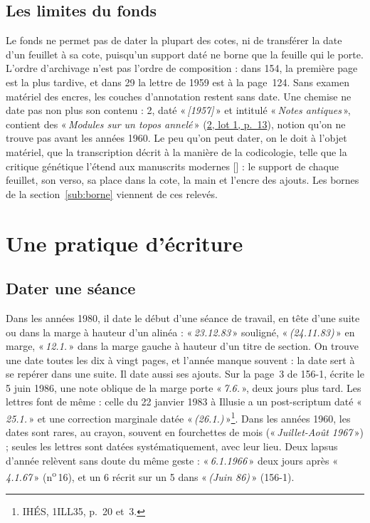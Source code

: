 \documentclass[11pt]{amsart}
\makeatletter
\newcommand{\q}[1]{«\,\textit{#1}\,»}
\newcommand{\cote}[1]{\mbox{n\textsuperscript{o}\,#1}}
\def\RHM@first#1--#2\@nil{#1}
\DeclareRobustCommand{\lot}[3]{\begingroup\edef\RHM@pdfpage{\the\numexpr\RHM@first#3--\@nil+1\relax}\href{https://grothendieck.umontpellier.fr/#1.pdf\#page=\RHM@pdfpage}{#1, lot #2, p.~#3}\endgroup}
\newcommand{\lot}[3]{\href{https://grothendieck.commutator.io/\##1/#2/p#3}{#1, lot #2, p.~#3}}
\makeatother
\begin{document}
\subsection{Les limites du fonds}

Le fonds ne permet pas de dater la plupart des cotes, ni de transférer la date d'un feuillet à sa cote, puisqu'un support daté ne borne que la feuille qui le porte. L'ordre d'archivage n'est pas l'ordre de composition : dans 154, la première page est la plus tardive, et dans 29 la lettre de 1959 est à la page~124. Sans examen matériel des encres, les couches d'annotation restent sans date. Une chemise ne date pas non plus son contenu : 2, daté \q{[1957]} et intitulé \q{Notes antiques}, contient des \q{Modules sur un topos annelé} (\lot{2}{1}{13}), notion qu'on ne trouve pas avant les années 1960. Le peu qu'on peut dater, on le doit à l'objet matériel, que la transcription décrit à la manière de la codicologie, telle que la critique génétique l'étend aux manuscrits modernes [\citealp{gresillon1994}] : le support de chaque feuillet, son verso, sa place dans la cote, la main et l'encre des ajouts. Les bornes de la section~\ref{sub:borne} viennent de ces relevés.

\section{Une pratique d'écriture}\label{sec:pratique}

\subsection{Dater une séance}\label{sub:seance}

Dans les années 1980, il date le début d'une séance de travail, en tête d'une suite ou dans la marge à hauteur d'un alinéa : \q{23.12.83} souligné, \q{(24.11.83)} en marge, \q{12.1.} dans la marge gauche à hauteur d'un titre de section. On trouve une date toutes les dix à vingt pages, et l'année manque souvent : la date sert à se repérer dans une suite. Il date aussi ses ajouts. Sur la page~3 de 156-1, écrite le 5 juin 1986, une note oblique de la marge porte \q{7.6.}, deux jours plus tard. Les lettres font de même : celle du 22 janvier 1983 à Illusie a un post-scriptum daté \q{25.1.} et une correction marginale datée \q{(26.1.)}\footnote{IHÉS, 1ILL35, p.~20 et~3.}. Dans les années 1960, les dates sont rares, au crayon, souvent en fourchettes de mois (\q{Juillet-Août 1967}) ; seules les lettres sont datées systématiquement, avec leur lieu. Deux lapsus d'année relèvent sans doute du même geste : \q{6.1.1966} deux jours après \q{4.1.67} (\cote{16}), et un 6 récrit sur un 5 dans \q{(Juin 86)} (156-1).
\end{document}
